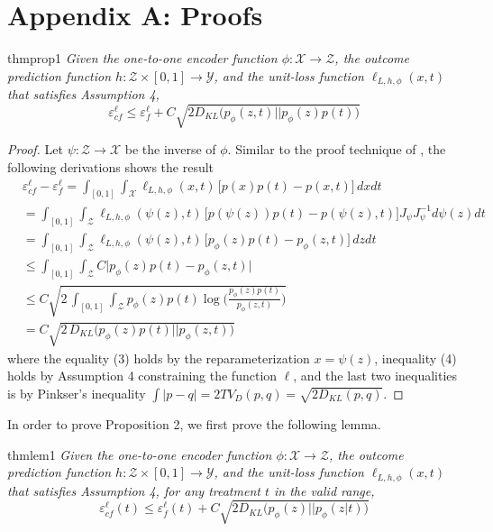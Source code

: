 \documentclass[letterpaper]{article} %
\begin{document}
\section*{Appendix A: Proofs}
\label{app:a}
\begin{restatable*}{thm}{prop1} 
\label{prop1}
\textit{
Given the one-to-one encoder function $\phi : \mathcal{X} \rightarrow \mathcal{Z}$, the outcome prediction function $h : \mathcal{Z} \times [0, 1] \rightarrow \mathcal{Y}$, and the unit-loss function $\ell_{L, h, \phi}(x, t)$ that satisfies Assumption 4,
\[
\varepsilon_{cf}^{\ell} \le \varepsilon_f^{\ell} + C\sqrt{ 2 D_{KL}\bigg(p_{\phi}(z, t) || p_{\phi}(z)p(t)\bigg)}
\]
}
\end{restatable*}
\begin{proof}
 Let $\psi : \mathcal{Z} \rightarrow \mathcal{X}$ be the inverse of $\phi$. Similar to the proof technique of \cite{shalit2017estimating}, the following derivations
shows the result
    \begin{align}
        & \varepsilon_{cf}^{\ell} -  \varepsilon_{f}^{\ell} = \int_{[0, 1]}\int_{\mathcal{X}} \ell_{L, h, \phi}(x, t)\, \big[p(x) p(t) - p(x, t) \big]\, dx dt \\
        &= \int_{[0, 1]}\int_{\mathcal{Z}} \ell_{L, h, \phi}(\psi(z), t)\, \big[p(\psi(z))p(t) - p(\psi(z), t)\big] J_{\psi}J_{\psi}^{-1} d\psi(z) dt \\
        &= \int_{[0, 1]}\int_{\mathcal{Z}} \ell_{L, h, \phi}(\psi(z), t)\, \big[p_\phi(z)p(t) - p_\phi(z, t)\big] \,dz dt \\
        &\le  \int_{[0, 1]}\int_{\mathcal{Z}} C \big| p_\phi(z)p(t) - p_\phi(z, t)\big| \\
        &\le  C \sqrt{2\, \int_{[0, 1]}\int_{\mathcal{Z}} p_{\phi}(z) p(t) \log\bigg(\frac{p_{\phi}(z) p(t)}{p_{\phi}(z, t)}\bigg)} \\
        &=  C \sqrt{2\,D_{KL}\bigg(p_{\phi}(z)p(t) || p_{\phi}(z, t)\bigg)}
    \end{align}
    where the equality (3) holds by the reparameterization $x= \psi(z)$, inequality (4)  holds by Assumption 4 constraining the function $\ell$, and the last two inequalities is by Pinkser's inequality $\int |p - q| =2{TV}_{D}(p, q) = \sqrt{2 D_{KL}(p, q)}$.
\end{proof}
In order to prove Proposition 2, we first prove the following lemma.
\\
\begin{restatable*}{thm}{lem1} 
\label{lem1}
\textit{
Given the one-to-one encoder function $\phi : \mathcal{X} \rightarrow \mathcal{Z}$, the outcome prediction function $h : \mathcal{Z} \times [0, 1] \rightarrow \mathcal{Y}$, and the unit-loss function $\ell_{L, h, \phi}(x, t)$ that satisfies Assumption 4, for any treatment $t$ in the valid range,
\[
\varepsilon_{cf}^{\ell}(t) \le \varepsilon_f^{\ell}(t) + C\sqrt{ 2 D_{KL}\bigg(p_{\phi}(z) \big|\big| p_{\phi}(z|t)\bigg)}
\]
}
\end{restatable*}
\end{document}
